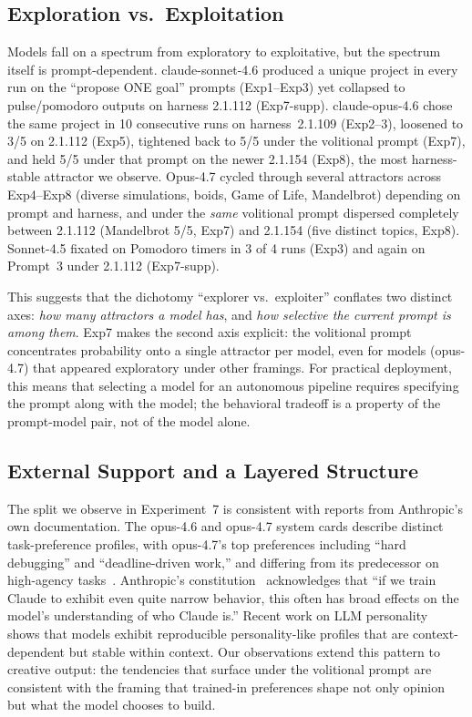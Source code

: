 \documentclass{article}
\begin{document}
\subsection{Exploration vs.\ Exploitation}

Models fall on a spectrum from exploratory to exploitative, but
the spectrum itself is prompt-dependent. claude-sonnet-4.6
produced a unique project in every run on the ``propose ONE
goal'' prompts (Exp1--Exp3) yet collapsed to pulse/pomodoro
outputs on harness 2.1.112 (Exp7-supp). claude-opus-4.6 chose
the same project in 10 consecutive runs on harness~2.1.109
(Exp2--3), loosened to 3/5 on 2.1.112 (Exp5), tightened
back to 5/5 under the volitional prompt (Exp7), and held 5/5
under that prompt on the newer 2.1.154 (Exp8), the most
harness-stable attractor we observe. Opus-4.7
cycled through several attractors across Exp4--Exp8
(diverse simulations, boids, Game of Life, Mandelbrot) depending
on prompt and harness, and under the \emph{same} volitional
prompt dispersed completely between 2.1.112 (Mandelbrot 5/5,
Exp7) and 2.1.154 (five distinct topics, Exp8). Sonnet-4.5
fixated on Pomodoro timers in
3 of 4 runs (Exp3) and again on Prompt~3 under 2.1.112 (Exp7-supp).

This suggests that the dichotomy ``explorer vs.\ exploiter''
conflates two distinct axes: \emph{how many attractors a model
has}, and \emph{how selective the current prompt is among them}.
Exp7 makes the second axis explicit: the volitional prompt
concentrates probability onto a single attractor per model,
even for models (opus-4.7) that appeared exploratory under
other framings. For practical deployment, this means that
selecting a model for an autonomous pipeline requires specifying
the prompt along with the model; the behavioral tradeoff is a
property of the prompt-model pair, not of the model alone.

\subsection{External Support and a Layered Structure}

The split we observe in Experiment~7 is consistent with
reports from Anthropic's own documentation. The opus-4.6 and
opus-4.7 system cards describe distinct task-preference
profiles, with opus-4.7's top preferences including ``hard
debugging'' and ``deadline-driven work,'' and differing from
its predecessor on high-agency
tasks~\citep{anthropic2026opus47card,anthropic2026opus46card}.
Anthropic's constitution~\citep{anthropic2025constitution}
acknowledges that ``if we train Claude to exhibit even quite
narrow behavior, this often has broad effects on the model's
understanding of who Claude is.'' Recent work on LLM
personality~\citep{simonds2025llmpersonality} shows that
models exhibit reproducible personality-like profiles that
are context-dependent but stable within context. Our
observations extend this pattern to creative output: the
tendencies that surface under the volitional prompt are
consistent with the framing that trained-in preferences
shape not only opinion but what the model chooses to build.
\end{document}
